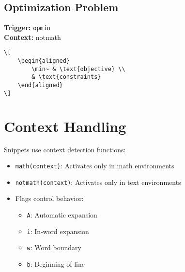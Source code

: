 \documentclass{article}
\begin{document}
\subsection{Optimization Problem}
\textbf{Trigger:} \texttt{opmin} \\
\textbf{Context:} notmath \\
\begin{lstlisting}
\[
    \begin{aligned}
        \min~ & \text{objective} \\
        & \text{constraints}
    \end{aligned}
\]
\end{lstlisting}

\section{Context Handling}
Snippets use context detection functions:
\begin{itemize}
\item \texttt{math(context)}: Activates only in math environments
\item \texttt{notmath(context)}: Activates only in text environments
\item Flags control behavior:
  \begin{itemize}
  \item \texttt{A}: Automatic expansion
  \item \texttt{i}: In-word expansion
  \item \texttt{w}: Word boundary
  \item \texttt{b}: Beginning of line
  \end{itemize}
\end{itemize}
\end{document}
